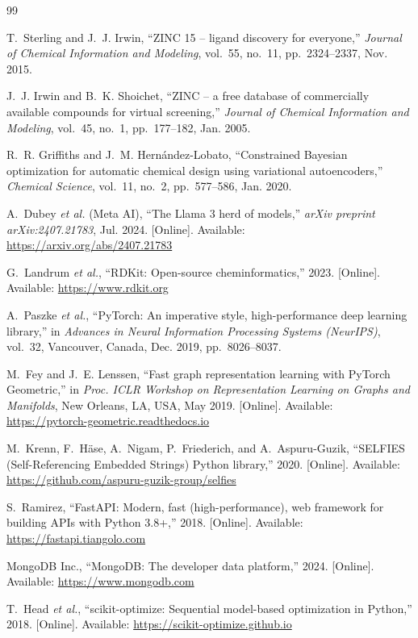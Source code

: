 \documentclass[12pt,a4paper]{report}
\begin{document}
\begin{thebibliography}{99}

T.~Sterling and J.~J. Irwin,
``ZINC 15 -- ligand discovery for everyone,''
\textit{Journal of Chemical Information and Modeling}, vol.~55, no.~11, pp.~2324--2337, Nov. 2015.

J.~J. Irwin and B.~K. Shoichet,
``ZINC -- a free database of commercially available compounds for virtual screening,''
\textit{Journal of Chemical Information and Modeling}, vol.~45, no.~1, pp.~177--182, Jan. 2005.


R.~R. Griffiths and J.~M. Hern\'{a}ndez-Lobato,
``Constrained Bayesian optimization for automatic chemical design using variational autoencoders,''
\textit{Chemical Science}, vol.~11, no.~2, pp.~577--586, Jan. 2020.


A.~Dubey \textit{et al.} (Meta AI),
``The Llama 3 herd of models,''
\textit{arXiv preprint arXiv:2407.21783}, Jul. 2024.
[Online]. Available: \url{https://arxiv.org/abs/2407.21783}


G.~Landrum \textit{et al.},
``RDKit: Open-source cheminformatics,''
2023.
[Online]. Available: \url{https://www.rdkit.org}

A.~Paszke \textit{et al.},
``PyTorch: An imperative style, high-performance deep learning library,''
in \textit{Advances in Neural Information Processing Systems (NeurIPS)},
vol.~32, Vancouver, Canada, Dec. 2019, pp.~8026--8037.

M.~Fey and J.~E. Lenssen,
``Fast graph representation learning with PyTorch Geometric,''
in \textit{Proc. ICLR Workshop on Representation Learning on Graphs and Manifolds},
New Orleans, LA, USA, May 2019.
[Online]. Available: \url{https://pytorch-geometric.readthedocs.io}

M.~Krenn, F.~H\"{a}se, A.~Nigam, P.~Friederich, and A.~Aspuru-Guzik,
``SELFIES (Self-Referencing Embedded Strings) Python library,''
2020.
[Online]. Available: \url{https://github.com/aspuru-guzik-group/selfies}

S.~Ramirez,
``FastAPI: Modern, fast (high-performance), web framework for building APIs with Python 3.8+,''
2018.
[Online]. Available: \url{https://fastapi.tiangolo.com}

MongoDB Inc.,
``MongoDB: The developer data platform,''
2024.
[Online]. Available: \url{https://www.mongodb.com}

T.~Head \textit{et al.},
``scikit-optimize: Sequential model-based optimization in Python,''
2018.
[Online]. Available: \url{https://scikit-optimize.github.io}

\end{thebibliography}
\end{document}
